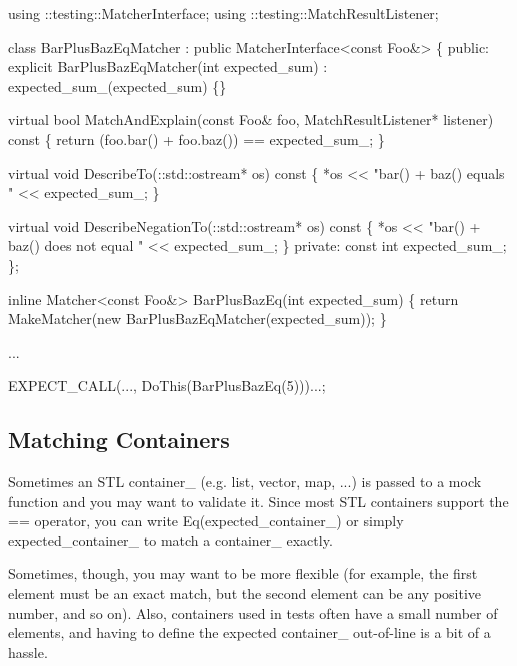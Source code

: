 \begin{DoxyCode}
using ::testing::MatcherInterface;
using ::testing::MatchResultListener;

\textcolor{keyword}{class }BarPlusBazEqMatcher : \textcolor{keyword}{public} MatcherInterface<const Foo&> \{
 \textcolor{keyword}{public}:
  \textcolor{keyword}{explicit} BarPlusBazEqMatcher(\textcolor{keywordtype}{int} expected\_sum)
      : expected\_sum\_(expected\_sum) \{\}

  \textcolor{keyword}{virtual} \textcolor{keywordtype}{bool} MatchAndExplain(\textcolor{keyword}{const} Foo& foo,
                               MatchResultListener* listener)\textcolor{keyword}{ const }\{
    \textcolor{keywordflow}{return} (foo.bar() + foo.baz()) == expected\_sum\_;
  \}

  \textcolor{keyword}{virtual} \textcolor{keywordtype}{void} DescribeTo(::std::ostream* os)\textcolor{keyword}{ const }\{
    *os << \textcolor{stringliteral}{"bar() + baz() equals "} << expected\_sum\_;
  \}

  \textcolor{keyword}{virtual} \textcolor{keywordtype}{void} DescribeNegationTo(::std::ostream* os)\textcolor{keyword}{ const }\{
    *os << \textcolor{stringliteral}{"bar() + baz() does not equal "} << expected\_sum\_;
  \}
 \textcolor{keyword}{private}:
  \textcolor{keyword}{const} \textcolor{keywordtype}{int} expected\_sum\_;
\};

\textcolor{keyword}{inline} Matcher<const Foo&> BarPlusBazEq(\textcolor{keywordtype}{int} expected\_sum) \{
  \textcolor{keywordflow}{return} MakeMatcher(\textcolor{keyword}{new} BarPlusBazEqMatcher(expected\_sum));
\}

...

  EXPECT\_CALL(..., DoThis(BarPlusBazEq(5)))...;
\end{DoxyCode}


\subsection*{Matching Containers}

Sometimes an S\+TL container_ (e.\+g. list, vector, map, ...) is passed to a mock function and you may want to validate it. Since most S\+TL containers support the {\ttfamily ==} operator, you can write {\ttfamily Eq(expected\+\_\+container_)} or simply {\ttfamily expected\+\_\+container_} to match a container_ exactly.

Sometimes, though, you may want to be more flexible (for example, the first element must be an exact match, but the second element can be any positive number, and so on). Also, containers used in tests often have a small number of elements, and having to define the expected container_ out-\/of-\/line is a bit of a hassle.

